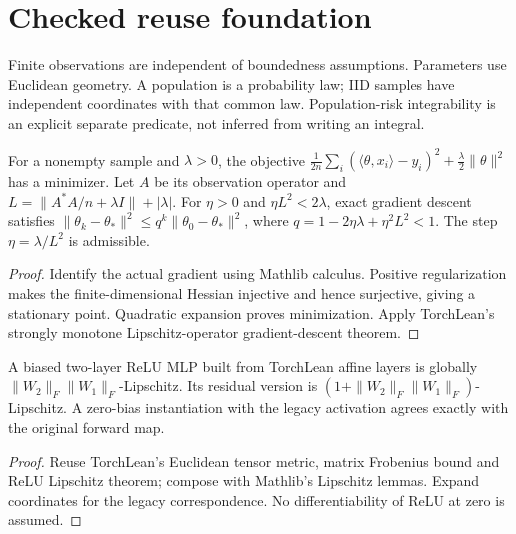 \chapter{Checked reuse foundation}

\begin{definition}\label{def:reuse_data}
\leanok
Finite observations are independent of boundedness assumptions. Parameters use
Euclidean geometry. A population is a probability law; IID samples have independent
coordinates with that common law. Population-risk integrability is an explicit
separate predicate, not inferred from writing an integral.
\end{definition}

\begin{lemma}\label{lem:reuse_ridge}
\leanok
{}
For a nonempty sample and $\lambda>0$, the objective
$\frac{1}{2n}\sum_i(\langle\theta,x_i\rangle-y_i)^2+
\frac{\lambda}{2}\|\theta\|^2$ has a minimizer. Let $A$ be its observation
operator and $L=\|A^*A/n+\lambda I\|+|\lambda|$.
For $\eta>0$ and $\eta L^2<2\lambda$, exact gradient descent satisfies
$\|\theta_k-\theta_*\|^2\leq q^k\|\theta_0-\theta_*\|^2$,
where $q=1-2\eta\lambda+\eta^2L^2<1$.
The step $\eta=\lambda/L^2$ is admissible.
\end{lemma}
\begin{proof}
\leanok
Identify the actual gradient using Mathlib calculus. Positive regularization makes
the finite-dimensional Hessian injective and hence surjective, giving a stationary
point. Quadratic expansion proves minimization. Apply TorchLean's strongly monotone
Lipschitz-operator gradient-descent theorem.
\end{proof}

\begin{lemma}\label{lem:reuse_mlp}
\leanok
A biased two-layer ReLU MLP built from TorchLean affine layers is globally
$\|W_2\|_F\|W_1\|_F$-Lipschitz. Its residual version is
$(1+\|W_2\|_F\|W_1\|_F)$-Lipschitz. A zero-bias instantiation with the legacy
activation agrees exactly with the original forward map.
\end{lemma}
\begin{proof}
\leanok
Reuse TorchLean's Euclidean tensor metric, matrix Frobenius bound and ReLU
Lipschitz theorem; compose with Mathlib's Lipschitz lemmas. Expand coordinates
for the legacy correspondence. No differentiability of ReLU at zero is assumed.
\end{proof}

